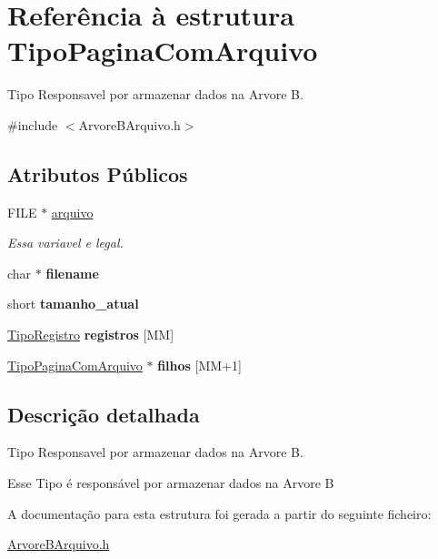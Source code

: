 \hypertarget{structTipoPaginaComArquivo}{}\section{Referência à estrutura Tipo\+Pagina\+Com\+Arquivo}
\label{structTipoPaginaComArquivo}


Tipo Responsavel por armazenar dados na Arvore B.  




{\ttfamily \#include $<$Arvore\+B\+Arquivo.\+h$>$}

\subsection*{Atributos Públicos}
\begin{DoxyCompactItemize}
\item 
\mbox{\label{structTipoPaginaComArquivo_ac1fe3c45d98cdeda70d7db3dbb7bb289}} 
F\+I\+LE $\ast$ \hyperlink{structTipoPaginaComArquivo_ac1fe3c45d98cdeda70d7db3dbb7bb289}{arquivo}
\begin{DoxyCompactList}\small\item\em Essa variavel e legal. \end{DoxyCompactList}\item 
\mbox{\label{structTipoPaginaComArquivo_afffa3434d714d594dc7f25abb347aa38}} 
char $\ast$ {\bfseries filename}
\item 
\mbox{\label{structTipoPaginaComArquivo_a357acf18ed4591fb2933dffcc04cb280}} 
short {\bfseries tamanho\+\_\+atual}
\item 
\mbox{\label{structTipoPaginaComArquivo_a3f37ff37a4f5f0b940229dd740f4896f}} 
\hyperlink{structTipoRegistro}{Tipo\+Registro} {\bfseries registros} \mbox{[}MM\mbox{]}
\item 
\mbox{\label{structTipoPaginaComArquivo_a2cc5869a74fa5acef08bdda69afcad69}} 
\hyperlink{structTipoPaginaComArquivo}{Tipo\+Pagina\+Com\+Arquivo} $\ast$ {\bfseries filhos} \mbox{[}MM+1\mbox{]}
\end{DoxyCompactItemize}


\subsection{Descrição detalhada}
Tipo Responsavel por armazenar dados na Arvore B. 

Esse Tipo é responsável por armazenar dados na Arvore B 

A documentação para esta estrutura foi gerada a partir do seguinte ficheiro\+:\begin{DoxyCompactItemize}
\item 
\hyperlink{ArvoreBArquivo_8h}{Arvore\+B\+Arquivo.\+h}\end{DoxyCompactItemize}
